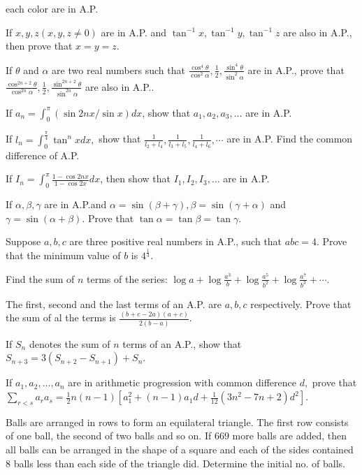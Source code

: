   each color are in A.P.
\item If $x, y, z(x, y, z\neq 0)$ are in A.P. and $\tan^{-1}x, \tan^{-1}y, \tan^{-1}z$ are also in A.P., then prove that
  $x = y = z$.
\item If $\theta$ and $\alpha$ are two real numbers such that $\frac{\cos^4\theta}{\cos^2\alpha}, \frac{1}{2},
  \frac{\sin^4\theta}{\sin^2\alpha}$ are in A.P., prove that $\frac{\cos^{2n + 2}\theta}{\cos^{2n}\alpha}, \frac{1}{2},
  \frac{\sin^{2n + 2}\theta}{\sin^{2n}\alpha}$ are also in A.P..
\item If $a_n = \displaystyle\int_0^\pi (\sin 2nx/\sin x)dx$, show that $a_1, a_2, a_3, \ldots$ are in A.P.
\item If $l_n = \displaystyle\int_0^{\tfrac{\pi}{4}}\tan^nxdx,$ show that $\frac{1}{l_2 + l_4}, \frac{1}{l_3 + l_5}, \frac{1}{l_4 + l_6},
  \cdots$ are in A.P. Find the common difference of A.P.
\item If $I_n = \displaystyle\int_{0}^\pi\frac{1 - \cos2nx}{1 - \cos2x}dx$, then show that $I_1, I_2, I_3,
  \ldots$ are in A.P.
\item If $\alpha, \beta, \gamma$ are in A.P.and $\alpha = \sin(\beta + \gamma), \beta = \sin(\gamma + \alpha)$ and $\gamma
  = \sin(\alpha + \beta).$ Prove that $\tan \alpha = \tan \beta = \tan \gamma$.
\item Suppose $a, b, c$ are three positive real numbers in A.P., such that $abc = 4.$ Prove that the minimum value of $b$
  is $4^{\tfrac{1}{3}}$.
\item Find the sum of $n$ terms of the series: $\log a + \log\frac{a^3}{b} + \log \frac{a^5}{b^2} + \log \frac{a^7}{b^3} +
  \cdots$.
\item The first, second and the last terms of an A.P. are $a,b, c$ respectively. Prove that the sum of al the terms is
  $\frac{(b + c - 2a)(a + c)}{2(b - a)}$.
\item If $S_n$ denotes the sum of $n$ terms of an A.P., show that $S_{n + 3} = 3(S_{n + 2} - S_{n + 1}) + S_n$.
\item If $a_1, a_2, \ldots, a_n$ are in arithmetic progression with common difference $d,$ prove that
  $\displaystyle\sum_{r < s}a_ra_s = \frac{1}{2}n(n - 1)[a_1^2 + (n - 1)a_1d + \frac{1}{12}(3n^2 - 7n + 2)d^2]$.
\item Balls are arranged in rows to form an equilateral triangle. The first row consists of one ball, the second of two
  balls and so on. If $669$ more balls are added, then all balls can be arranged in the shape of a square and each of the sides
  contained $8$ balls less than each side of the triangle did. Determine the initial no. of balls.

